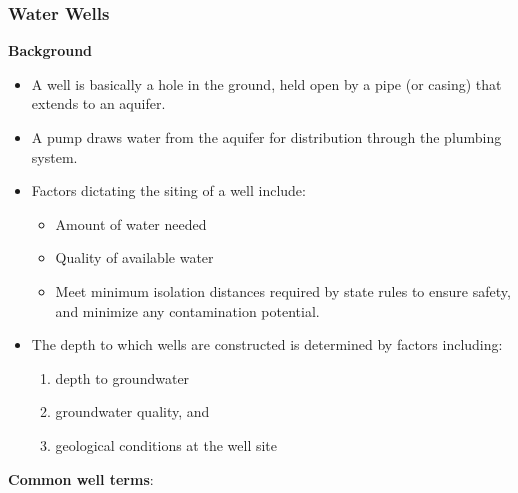 \subsubsection{Water Wells}
\textbf{Background}
\begin{itemize}
\item A well is basically a hole in the ground, held open by a pipe (or casing) that extends to an aquifer.
\item A pump draws water from the aquifer for distribution through the plumbing system. 
\item Factors dictating the siting of a well include:
\begin{itemize}
\item Amount of water needed
\item Quality of available water
\item Meet minimum isolation distances required by state rules to ensure safety, and minimize any contamination potential.
\end{itemize}
\item The depth to which wells are constructed is determined by factors including:
\begin{enumerate}
\item depth to groundwater
\item groundwater quality, and 
\item geological conditions at the well site
\end{enumerate}
\end{itemize}
\textbf{Common well terms}:
